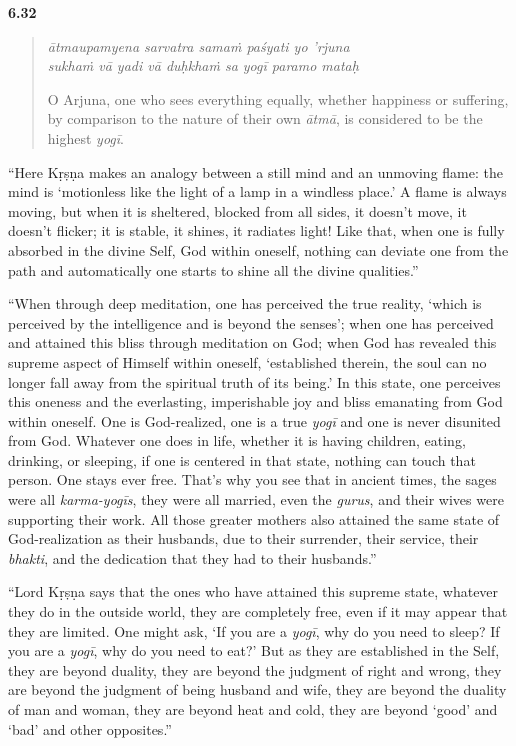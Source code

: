 \par\noindent\textbf{6.32}\par
\begin{verse}
\textit{ātmaupamyena sarvatra samaṁ paśyati yo ’rjuna} \\
\textit{sukhaṁ vā yadi vā duḥkhaṁ sa yogī paramo mataḥ}

\noindent O Arjuna, one who sees everything equally, whether happiness or suffering, by comparison to the nature of their own \textit{ātmā}, is considered to be the highest \textit{yogī}.
\end{verse}
\par


\enquote{Here Kṛṣṇa makes an analogy between a still mind and an unmoving flame: the mind is \enquote{motionless like the light of a lamp in a windless place.} A flame is always moving, but when it is sheltered, blocked from all sides, it doesn’t move, it doesn’t flicker; it is stable, it shines, it radiates light! Like that, when one is fully absorbed in the divine Self, God within oneself, nothing can deviate one from the path and automatically one starts to shine all the divine qualities.}

\enquote{When through deep meditation, one has perceived the true reality, \enquote{which is perceived by the intelligence and is beyond the senses}; when one has perceived and attained this bliss through meditation on God; when God has revealed this supreme aspect of Himself within oneself, \enquote{established therein, the soul can no longer fall away from the spiritual truth of its being.} In this state, one perceives this oneness and the everlasting, imperishable joy and bliss emanating from God within oneself. One is God-realized, one is a true \textit{yogī} and one is never disunited from God. Whatever one does in life, whether it is having children, eating, drinking, or sleeping, if one is centered in that state, nothing can touch that person. One stays ever free. That’s why you see that in ancient times, the sages were all \textit{karma-yogīs}, they were all married, even the \textit{gurus}, and their wives were supporting their work. All those greater mothers also attained the same state of God-realization as their husbands, due to their surrender, their service, their \textit{bhakti}, and the dedication that they had to their husbands.}

\enquote{Lord Kṛṣṇa says that the ones who have attained this supreme state, whatever they do in the outside world, they are completely free, even if it may appear that they are limited. One might ask, \enquote{If you are a \textit{yogī}, why do you need to sleep? If you are a \textit{yogī}, why do you need to eat?} But as they are established in the Self, they are beyond duality, they are beyond the judgment of right and wrong, they are beyond the judgment of being husband and wife, they are beyond the duality of man and woman, they are beyond heat and cold, they are beyond \enquote{good} and \enquote{bad} and other opposites.}

